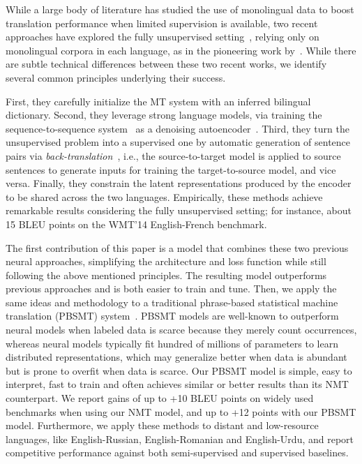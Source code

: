 \documentclass[11pt,a4paper]{article}
\begin{document}
While a large body of literature has studied the use of monolingual data to boost translation performance when limited supervision is available, two recent approaches have explored the fully unsupervised setting~\cite{unsupNMTlample, unsupNMTartetxe}, relying only on monolingual corpora in each language, as in the pioneering work by~\citet{knight_acl11}. While there are subtle technical differences between these two recent works, we identify several common principles underlying their success. 

First, they carefully initialize the MT system with an inferred bilingual dictionary. Second, they leverage strong language models, via training the sequence-to-sequence system~\cite{sutskever2014sequence, attentionNMT} as a denoising autoencoder~\cite{vincent2008extracting}. 
Third, they turn the unsupervised problem into a supervised one by automatic generation of sentence pairs via \textit{back-translation}~\cite{sennrich2015improving}, i.e., the source-to-target model is 
applied to source sentences to generate inputs for training the target-to-source model, and vice versa.
Finally, they constrain the latent representations produced by the encoder to be shared across the two languages.
Empirically, these methods achieve remarkable results considering the fully unsupervised setting; for instance,  about 15 BLEU points on the WMT'14 English-French benchmark.

The first contribution of this paper is a model that combines these two previous neural approaches, simplifying the architecture and loss function while still following the above mentioned principles. The resulting model outperforms previous approaches and is both easier to train and tune. Then, we apply the same ideas and methodology to a traditional phrase-based statistical machine translation (PBSMT) system~\cite{pbsmt}. PBSMT models are well-known to outperform neural models when labeled data is scarce because they merely count occurrences, whereas neural models typically fit hundred of millions of parameters to learn distributed representations, which may generalize better when data is abundant but is prone to overfit when data is scarce. Our PBSMT model is simple, easy to interpret, fast to train and often achieves similar or better results than its NMT counterpart. We report gains of up to +10 BLEU points on widely used benchmarks when using our NMT model, and up to +12 points with our PBSMT model. 
Furthermore, we apply these methods to distant and low-resource languages, like English-Russian, English-Romanian and English-Urdu, and report competitive performance against both semi-supervised and supervised baselines.
\end{document}

